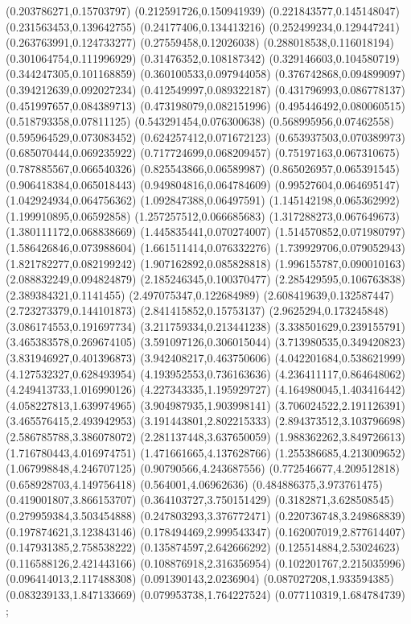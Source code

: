 {    (0.203786271,0.15703797)
    (0.212591726,0.150941939)
    (0.221843577,0.145148047)
    (0.231563453,0.139642755)
    (0.24177406,0.134413216)
    (0.252499234,0.129447241)
    (0.263763991,0.124733277)
    (0.27559458,0.12026038)
    (0.288018538,0.116018194)
    (0.301064754,0.111996929)
    (0.31476352,0.108187342)
    (0.329146603,0.104580719)
    (0.344247305,0.101168859)
    (0.360100533,0.097944058)
    (0.376742868,0.094899097)
    (0.394212639,0.092027234)
    (0.412549997,0.089322187)
    (0.431796993,0.086778137)
    (0.451997657,0.084389713)
    (0.473198079,0.082151996)
    (0.495446492,0.080060515)
    (0.518793358,0.07811125)
    (0.543291454,0.076300638)
    (0.568995956,0.07462558)
    (0.595964529,0.073083452)
    (0.624257412,0.071672123)
    (0.653937503,0.070389973)
    (0.685070444,0.069235922)
    (0.717724699,0.068209457)
    (0.75197163,0.067310675)
    (0.787885567,0.066540326)
    (0.825543866,0.06589987)
    (0.865026957,0.065391545)
    (0.906418384,0.065018443)
    (0.949804816,0.064784609)
    (0.99527604,0.064695147)
    (1.042924934,0.064756362)
    (1.092847388,0.06497591)
    (1.145142198,0.065362992)
    (1.199910895,0.06592858)
    (1.257257512,0.066685683)
    (1.317288273,0.067649673)
    (1.380111172,0.068838669)
    (1.445835441,0.070274007)
    (1.514570852,0.071980797)
    (1.586426846,0.073988604)
    (1.661511414,0.076332276)
    (1.739929706,0.079052943)
    (1.821782277,0.082199242)
    (1.907162892,0.085828818)
    (1.996155787,0.090010163)
    (2.088832249,0.094824879)
    (2.185246345,0.100370477)
    (2.285429595,0.106763838)
    (2.389384321,0.1141455)
    (2.497075347,0.122684989)
    (2.608419639,0.132587447)
    (2.723273379,0.144101873)
    (2.841415852,0.15753137)
    (2.9625294,0.173245848)
    (3.086174553,0.191697734)
    (3.211759334,0.213441238)
    (3.338501629,0.239155791)
    (3.465383578,0.269674105)
    (3.591097126,0.306015044)
    (3.713980535,0.349420823)
    (3.831946927,0.401396873)
    (3.942408217,0.463750606)
    (4.042201684,0.538621999)
    (4.127532327,0.628493954)
    (4.193952553,0.736163636)
    (4.236411117,0.864648062)
    (4.249413733,1.016990126)
    (4.227343335,1.195929727)
    (4.164980045,1.403416442)
    (4.058227813,1.639974965)
    (3.904987935,1.903998141)
    (3.706024522,2.191126391)
    (3.465576415,2.493942953)
    (3.191443801,2.802215333)
    (2.894373512,3.103796698)
    (2.586785788,3.386078072)
    (2.281137448,3.637650059)
    (1.988362262,3.849726613)
    (1.716780443,4.016974751)
    (1.471661665,4.137628766)
    (1.255386685,4.213009652)
    (1.067998848,4.246707125)
    (0.90790566,4.243687556)
    (0.772546677,4.209512818)
    (0.658928703,4.149756418)
    (0.564001,4.06962636)
    (0.484886375,3.973761475)
    (0.419001807,3.866153707)
    (0.364103727,3.750151429)
    (0.3182871,3.628508545)
    (0.279959384,3.503454888)
    (0.247803293,3.376772471)
    (0.220736748,3.249868839)
    (0.197874621,3.123843146)
    (0.178494469,2.999543347)
    (0.162007019,2.877614407)
    (0.147931385,2.758538222)
    (0.135874597,2.642666292)
    (0.125514884,2.53024623)
    (0.116588126,2.421443166)
    (0.108876918,2.316356954)
    (0.102201767,2.215035996)
    (0.096414013,2.117488308)
    (0.091390143,2.0236904)
    (0.087027208,1.933594385)
    (0.083239133,1.847133669)
    (0.079953738,1.764227524)
    (0.077110319,1.684784739)
    };